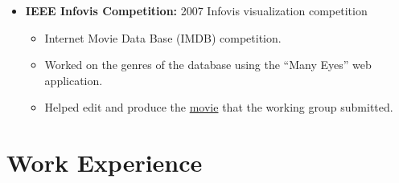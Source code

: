 \documentclass[oneside]{article}
\begin{document}
\begin{itemize}
\item{\bf IEEE Infovis Competition:} 2007 Infovis visualization competition
\begin{itemize}
  \item Internet Movie Data Base (IMDB) competition.
  \item Worked on the genres of the database using the ``Many Eyes'' web application.
  \item Helped edit and produce the \href{http://had.co.nz/infovis-2007/}{movie} that the working group submitted.
\end{itemize}


\end{itemize}



\section{Work Experience}
\end{document}
